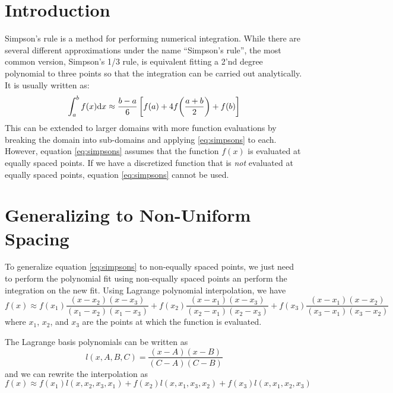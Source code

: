 \documentclass[letterpaper,10pt]{article}
\begin{document}
\section{Introduction}

Simpson's rule is a method for performing numerical integration. While there are several different approximations under the name ``Simpson's rule'', the most
common version, Simpson's 1/3 rule, is equivalent fitting a 2'nd degree polynomial to three points so that the integration can be carried out analytically.
It is usually written as:
\begin{equation}
  \label{eq:simpsons}
  \int_a^b f(x) \dd x \approx \frac{b-a}{6}\left[ f(a) + 4f\qty(\frac{a+b}{2}) + f(b)\right]
\end{equation}
This can be extended to larger domains with more function evaluations by breaking the domain into sub-domains and applying
\ref{eq:simpsons} to each.
However, equation \ref{eq:simpsons} assumes that the function $f(x)$ is evaluated at equally spaced points. If we have a discretized
function that is \emph{not} evaluated at equally spaced points, equation \ref{eq:simpsons} cannot be used.

\section{Generalizing to Non-Uniform Spacing}

To generalize equation \ref{eq:simpsons} to non-equally spaced points, we just need to perform the polynomial fit using non-equally spaced points an
perform the integration on the new fit. Using Lagrange polynomial interpolation, we have
\begin{equation}
  f(x) \approx f(x_1) \frac{ (x-x_2)(x-x_3) }{ (x_1 - x_2)(x_1 - x_3) }
             + f(x_2) \frac{ (x-x_1)(x-x_3) }{ (x_2 - x_1)(x_2 - x_3) }
             + f(x_3) \frac{ (x-x_1)(x-x_2) }{ (x_3 - x_1)(x_3 - x_2) }
\end{equation}
where $x_1$, $x_2$, and $x_3$ are the points at which the function is evaluated.

The Lagrange basis polynomials can be written as
\begin{equation}
  \label{eq:lagrange}
  l(x,A,B,C) = \frac{(x-A)(x-B)}{(C-A)(C-B)}
\end{equation}
and we can rewrite the interpolation as
\begin{equation}
  f(x) \approx
    f(x_1) l(x,x_2,x_3,x_1)
  + f(x_2) l(x,x_1,x_3,x_2)
  + f(x_3) l(x,x_1,x_2,x_3)
\end{equation}
\end{document}
